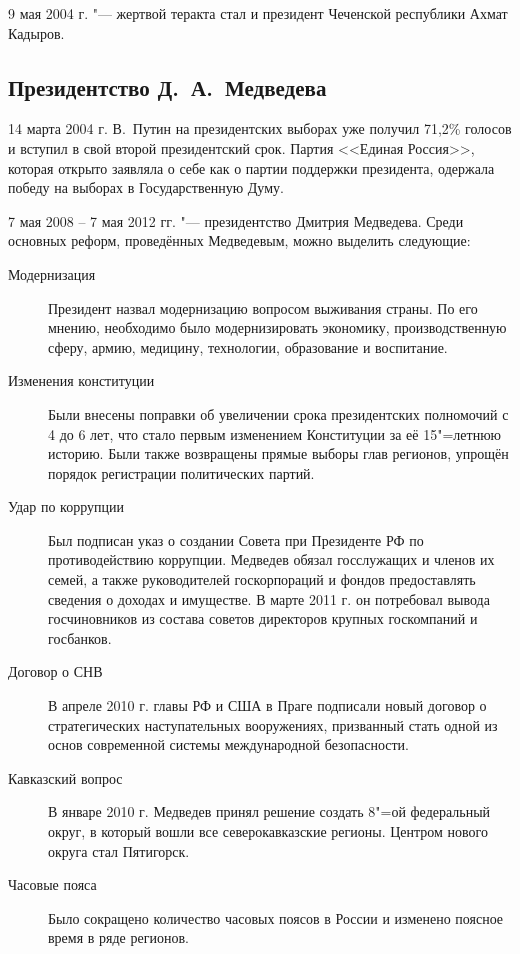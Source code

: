 9 мая 2004 г. "--- жертвой теракта стал и президент Чеченской республики Ахмат Кадыров. 

\subsection{Президентство Д.~А.~Медведева}
14 марта 2004 г. В.~Путин на президентских выборах уже получил 71,2\% голосов и вступил в свой второй президентский срок. Партия <<Единая Россия>>, которая открыто заявляла о себе как о партии поддержки президента, одержала победу на выборах в Государственную Думу.

7 мая 2008 -- 7 мая 2012 гг. "--- президентство Дмитрия Медведева. Среди основных реформ, проведённых Медведевым, можно выделить следующие:

\begin{description}

\item[Модернизация] Президент назвал модернизацию вопросом выживания страны. По его мнению, необходимо было модернизировать экономику, производственную сферу, армию, медицину, технологии, образование и воспитание.

\item[Изменения конституции] Были внесены поправки об увеличении срока президентских полномочий с 4 до 6 лет, что стало первым изменением Конституции за её 15"=летнюю историю. Были также возвращены прямые выборы глав регионов, упрощён порядок регистрации политических партий.

\item[Удар по коррупции] Был подписан указ о создании Совета при Президенте РФ по противодействию коррупции. Медведев обязал госслужащих и членов их семей, а также руководителей госкорпораций и фондов предоставлять сведения о доходах и имуществе. В марте 2011 г. он потребовал вывода госчиновников из состава советов директоров крупных госкомпаний и госбанков.

\item[Договор о СНВ] В апреле 2010 г. главы РФ и США в Праге подписали новый договор о стратегических наступательных вооружениях, призванный стать одной из основ современной системы международной безопасности.

\item[Кавказский вопрос] В январе 2010 г. Медведев принял решение создать 8"=ой федеральный округ, в который вошли все северокавказские регионы. Центром нового округа стал Пятигорск.

\item[Часовые пояса] Было сокращено количество часовых поясов в России и изменено поясное время в ряде регионов.

\end{description}

